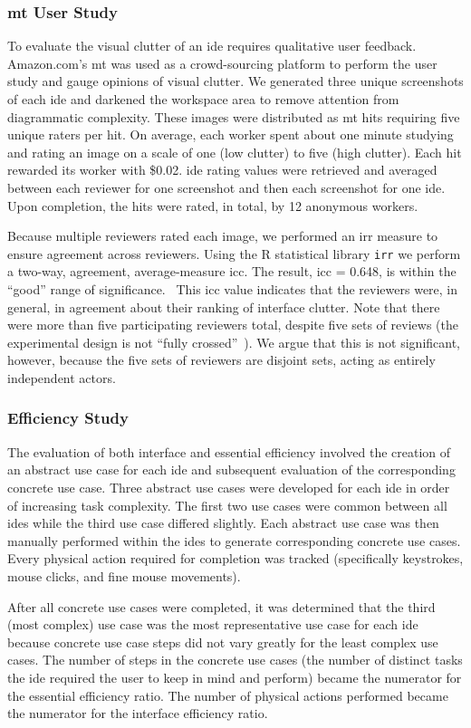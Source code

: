 \subsubsection{\acl{mt} User Study} \label{subsubsec:mturk} To evaluate the
visual clutter of an \ac{ide} requires qualitative user feedback.
Amazon.com's \ac{mt} was used as a crowd-sourcing platform to perform the
user study and gauge opinions of visual clutter. We generated three unique
screenshots of each \ac{ide} and darkened the workspace area to remove
attention from diagrammatic complexity. These images were distributed
as \ac{mt} \acp{hit} requiring five unique raters per \ac{hit}. On average,
each worker spent about one minute studying and rating an image on a scale
of one (low clutter) to five (high clutter). Each \ac{hit} rewarded its
worker with \$0.02. \ac{ide} rating values were retrieved and averaged
between each reviewer for one screenshot and then each screenshot for one
\ac{ide}. Upon completion, the \acp{hit} were rated, in total, by 12
anonymous workers.

Because multiple reviewers rated each image, we performed an \ac{irr}
measure to ensure agreement across reviewers. Using the R statistical
library \texttt{irr} we perform a two-way, agreement, average-measure
\ac{icc}. The result, \ac{icc} = 0.648, is within the ``good'' range of
significance.~\cite{cicchetti1994,hallgren2012} This \ac{icc} value
indicates that the reviewers were, in general, in agreement about their
ranking of interface clutter. Note that there were more than five
participating reviewers total, despite five sets of reviews (\ie the
experimental design is not ``fully crossed''~\cite{hallgren2012}). We argue
that this is not significant, however, because the five sets of reviewers
are disjoint sets, acting as entirely independent actors.

\subsubsection{Efficiency Study} \label{subsubsec:efficiency}
The
evaluation of both interface and essential efficiency involved the creation
of an abstract use case for each \ac{ide} and subsequent evaluation of the
corresponding concrete use case. Three abstract use cases were developed
for each \ac{ide} in order of increasing task complexity. The first two use
cases were common between all \acp{ide} while the third use case differed
slightly. Each abstract use case was then manually performed within the
\acp{ide} to generate corresponding concrete use cases. Every physical
action required for completion was tracked (specifically keystrokes, mouse
clicks, and fine mouse movements).

After all concrete use cases were completed, it was determined that the
third (most complex) use case was the most representative use case for each
\ac{ide} because concrete use case steps did not vary greatly for the least
complex use cases. The number of steps in the concrete use cases (\ie the
number of distinct tasks the \ac{ide} required the user to keep in mind and
perform) became the numerator for the essential efficiency ratio. The
number of physical actions performed became the numerator for the interface
efficiency ratio.
